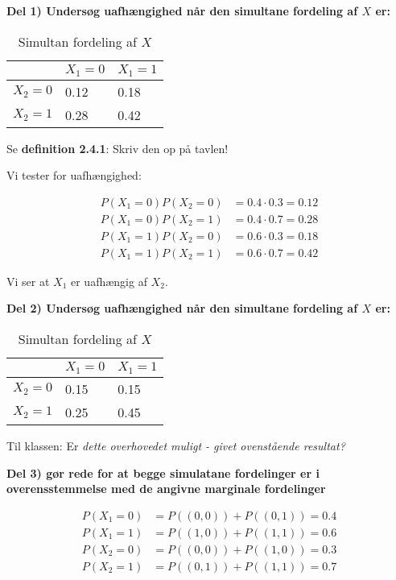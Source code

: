 \textbf{Del 1) Undersøg uafhængighed når den simultane fordeling af $X$ er:}

\begin{table}[ht]
\centering
\caption{Simultan fordeling af $X$}
\begin{tabular}{|l|l|l|}
\hline
          & $X_1=0$ & $X_1 = 1$ \\ \hline
$X_2 = 0$ & 0.12    & 0.18      \\ \hline
$X_2 = 1$ & 0.28    & 0.42      \\ \hline
\end{tabular}
\end{table}

Se \textbf{definition 2.4.1}: Skriv den op på tavlen!

Vi tester for uafhængighed:

\begin{align}
    P(X_1 = 0)P(X_2 = 0) &= 0.4 \cdot 0.3 = 0.12 \\
    P(X_1 = 0)P(X_2 = 1) &= 0.4 \cdot 0.7 = 0.28 \\
    P(X_1 = 1)P(X_2 = 0) &= 0.6 \cdot 0.3 = 0.18 \\
    P(X_1 = 1)P(X_2 = 1) &= 0.6 \cdot 0.7 = 0.42
\end{align}

Vi ser at $X_1$ er uafhængig af $X_2$.

\textbf{Del 2) Undersøg uafhængighed når den simultane fordeling af $X$ er:}

\begin{table}[ht]
\centering
\caption{Simultan fordeling af $X$}
\begin{tabular}{|l|l|l|}
\hline
          & $X_1=0$ & $X_1 = 1$ \\ \hline
$X_2 = 0$ & 0.15    & 0.15      \\ \hline
$X_2 = 1$ & 0.25    & 0.45      \\ \hline
\end{tabular}
\end{table}

Til klassen: Er \textit{dette overhovedet muligt - givet ovenstående resultat?} 

\textbf{Del 3) gør rede for at begge simulatane fordelinger er i overensstemmelse med de angivne marginale fordelinger}

\begin{align}
    P(X_1 = 0) &= P((0,0)) + P((0,1)) = 0.4 \\ 
    P(X_1 = 1) &= P((1,0))+P((1,1)) = 0.6 \\
    P(X_2 = 0) &= P((0,0)) + P((1,0)) = 0.3 \\
    P(X_2 = 1) &= P((0,1)) + P((1,1)) = 0.7
\end{align}

